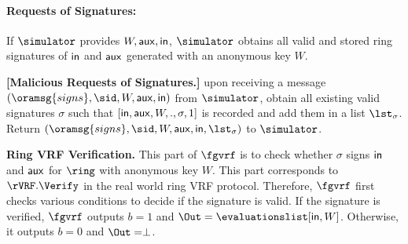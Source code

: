 \paragraph{Requests of  Signatures:} If $ \simulator $ provides $ W, \mathsf{aux}, \mathsf{in}$, $ \simulator $  obtains all valid and stored ring signatures of $ \mathsf{in} $ and $ \mathsf{aux} $ generated with an anonymous key $ W $.  

\begin{tcolorbox}[left=2pt,right=2pt]
	\eprint{}{\small}
	\textbf{[Malicious Requests of  Signatures.]} upon receiving a message $ (\oramsg{signs}, \sid, W, \aux,\msg) $ from $ \simulator $, obtain all existing valid signatures $ \sigma $ such that $ [\mathsf{in}, \mathsf{aux},W,.,\sigma, 1] $ is recorded and add them in a list $ \lst_{\sigma} $. 	Return $ (\oramsg{signs}, \sid, W,\aux,\msg, \lst_{\sigma})  $ to $ \simulator $.
\end{tcolorbox}




\noindent \textbf{Ring VRF Verification.} This part of $ \fgvrf $ is to check whether  $ \sigma $ signs $ \mathsf{in} $ and $ \mathsf{aux} $ for $ \ring $ with anonymous key $ W $. This part corresponds to $ \rVRF.\Verify $ in the real world ring VRF protocol. Therefore,
$ \fgvrf $ first checks various conditions to decide if the signature is valid. If the signature is verified, $ \fgvrf $ outputs $ b = 1 $ and $ \Out = \evaluationslist[\msg, W] $. Otherwise, it outputs $ b = 0 $ and $ \Out = \perp $. 


